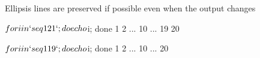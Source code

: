 Ellipsis lines are preserved if possible even when the output changes

\begin{sh}
$ for i in `seq 1 21`; do echo $i; done
1
2
...
10
...
19
20
\end{sh}

\begin{sh}
$ for i in `seq 1 19`; do echo $i; done
1
2
...
10
...
20
\end{sh}
